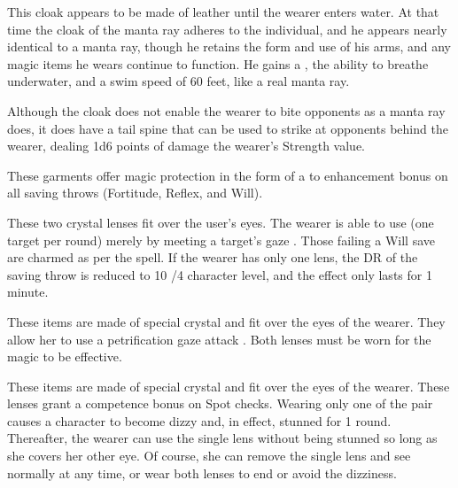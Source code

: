  This cloak appears to be made of leather until the wearer enters water. At that time the cloak of the manta ray adheres to the individual, and he appears nearly identical to a manta ray, though he retains the form and use of his arms, and any magic items he wears continue to function. He gains a  , the ability to breathe underwater, and a swim speed of 60 feet, like a real manta ray.

Although the cloak does not enable the wearer to bite opponents as a manta ray does, it does have a tail spine that can be used to strike at opponents behind the wearer, dealing 1d6 points of damage \add the wearer's Strength value.

  These garments offer magic protection in the form of a  to  enhancement bonus on all saving throws (Fortitude, Reflex, and Will).

 These two crystal lenses fit over the user's eyes. The wearer is able to use  (one target per round) merely by meeting a target's gaze . Those failing a Will save are charmed as per the spell. If the wearer has only one lens, the DR of the saving throw is reduced to 10 /4 character level, and the effect only lasts for 1 minute.

 These items are made of special crystal and fit over the eyes of the wearer. They allow her to use a petrification gaze attack . Both lenses must be worn for the magic to be effective.

 These items are made of special crystal and fit over the eyes of the wearer. These lenses grant a  competence bonus on Spot checks. Wearing only one of the pair causes a character to become dizzy and, in effect, stunned for 1 round. Thereafter, the wearer can use the single lens without being stunned so long as she covers her other eye. Of course, she can remove the single lens and see normally at any time, or wear both lenses to end or avoid the dizziness.

